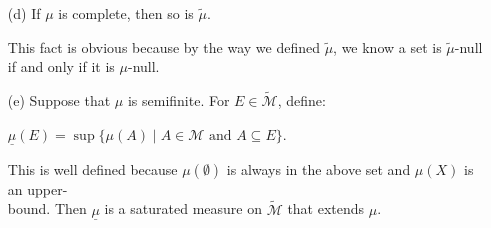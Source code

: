 \documentclass{book}
\newcommand{\exTwoP}{%
   \color{RedViolet}%
   \fontsize{13}{15}\selectfont%
}
\newenvironment{myIndent}{%
   \begin{adjustwidth}{2.5em}{0em}%
}{%
   \end{adjustwidth}%
}
\newcommand{\retTwo}{\hfill\bigbreak}
\begin{document}
\begin{enumerate}
   \begin{myIndent}\exTwoP
      Since $\emptyset \in \mathcal{M}$, we know $\widetilde{\mu}(\emptyset) = \mu(\emptyset) = 0$.\newpage 

      Note that if $A, B \in \widetilde{\mathcal{M}}$ with $A \subseteq B$ and $A \notin \mathcal{M}$ but $B \in \mathcal{M}$, then we\\ immediately get a contradiction since that would suggest $A = A \cap B \in \mathcal{M}$. As a result, supposing $(E_j)_{j \in \mathbb{N}}$ is a sequence of disjoint sets in $\widetilde{\mathcal{M}}$, we have that if any $E_j \notin \mathcal{M}$, then:\\ [-22pt]
      
      {\centering$\widetilde{\mu}(\bigcup\limits_{j \in \mathbb{N}}E_j) = \infty = \sum\limits_{j =1}^\infty \widetilde{\mu}(E_j)$.\retTwo\par}

      Meanwhile, if all sets of $(E_j)_{j \in \mathbb{N}}$ are in $\mathcal{M}$, then:\\ [-16pt]

      {\centering$\widetilde{\mu}(\bigcup\limits_{j \in \mathbb{N}}E_j) = \mu(\bigcup\limits_{j \in \mathbb{N}}E_j) = \sum\limits_{j =1}^\infty \mu(E_j) = \sum\limits_{j =1}^\infty \widetilde{\mu}(E_j)$.\retTwo\par}
   \end{myIndent}

   \item[(d)] If $\mu$ is complete, then so is $\widetilde{\mu}$.
   
   \begin{myIndent}\exTwoP
      This fact is obvious because by the way we defined $\widetilde{\mu}$, we know a set is $\widetilde{\mu}$-null if and only if it is $\mu$-null.\retTwo
   \end{myIndent}

   \item[(e)] Suppose that $\mu$ is semifinite. For $E \in \widetilde{\mathcal{M}}$, define:
   
   {\centering $\underline{\mu}(E) = \sup \{\mu(A) \mid A \in \mathcal{M} \text{ and } A \subseteq E \}$.\par}

   This is well defined because $\mu(\emptyset)$ is always in the above set and $\mu(X)$ is an upper-\\bound. Then $\underline{\mu}$ is a saturated measure on $\widetilde{\mathcal{M}}$ that extends $\mu$.\\ [-16pt]


\end{enumerate}
\end{document}
